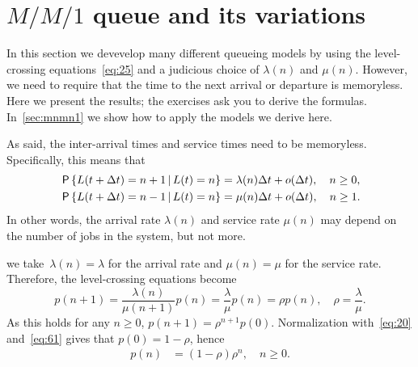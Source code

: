 

\section{$M/M/1$ queue and its variations}
\label{sec:mm1}


In this section we devevelop many different queueing models by using the level-crossing equations~\cref{eq:25} and a judicious choice of $\lambda(n)$ and $\mu(n)$. However,  we need to require that the time to the next arrival or departure is memoryless. Here we present the results; the exercises ask you to derive the formulas. In~\cref{sec:mnmn1} we show how to apply the models we derive here.

As said,  the inter-arrival times and service times need to be memoryless.
Specifically,  this means that
\begin{align*}
  \,\mathsf{P}\left\{L(t+\Delta t) = n+1 \,\middle|\, L(t) = n \right\} &= \lambda(n) \Delta t + o(\Delta t), \quad n\geq 0,\\
  \,\mathsf{P}\left\{L(t+\Delta t) = n-1 \,\middle|\, L(t) = n \right\} &= \mu(n) \Delta t + o(\Delta t), \quad n \geq 1.
\end{align*}
In other words, the arrival rate $\lambda(n)$ and service rate $\mu(n)$ may depend on the number of jobs in the system, but not more.


 we take~$\lambda(n)=\lambda$ for the arrival rate and $\mu(n)=\mu$ for the service rate.
Therefore, the level-crossing equations become
\begin{equation*}
 p(n+1) = \frac{\lambda(n)}{\mu(n+1)} p(n) = \frac{\lambda}{\mu} p(n) = \rho p(n),\quad \rho = \frac{\lambda}{\mu}.
\end{equation*}
As this holds for any $n\geq 0$, $p(n+1) = \rho^{n+1} p(0)$.
Normalization with~\cref{eq:20} and~\cref{eq:61} gives that $p(0) =1-\rho$, hence
\begin{align}\label{eq:23}
p(n) &= (1-\rho)\rho^{n}, \quad n \geq 0.
\end{align}

